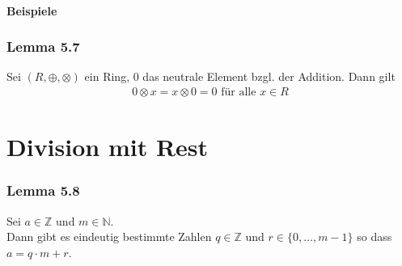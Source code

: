 \documentclass[a5paper, 10pt]{book}
\newcommand{\inN}{\in\mathbb{N}}
\newcommand{\inZ}{\in\mathbb{Z}}
\newcommand{\circleplus}{\oplus}%
\newcommand{\circlecdot}{\otimes}%
\begin{document}
			\paragraph{Beispiele}
			
			
			\subsubsection{Lemma 5.7}
				Sei $(R,\circleplus,\circlecdot)$ ein Ring, $0$ das neutrale Element bzgl. der Addition. Dann gilt
				\begin{align}
					0 \circlecdot x = x \circlecdot 0 = 0 \text{ für alle } x \in R
				\end{align}
				
		\section{Division mit Rest}
			
			\subsubsection{Lemma 5.8}
				Sei $a\inZ$ und $m\inN$.\\Dann gibt es eindeutig bestimmte Zahlen $q\inZ$ und $r\in\{0,\dots, m-1\}$ so dass $a = q\cdot m + r$.
			
\end{document}
